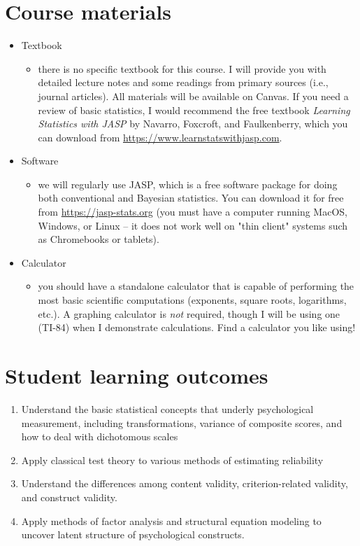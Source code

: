 \documentclass[10pt]{article}
\begin{document}
\section*{Course materials}
\label{sec:org05c7760}
\begin{itemize}
\item Textbook
\begin{itemize}
\item there is no specific textbook for this course. I will provide you with detailed lecture notes and some readings from primary sources (i.e., journal articles). All materials will be available on Canvas. If you need a review of basic statistics, I would recommend the free textbook \emph{Learning Statistics with JASP} by Navarro, Foxcroft, and Faulkenberry, which you can download from \url{https://www.learnstatswithjasp.com}.
\end{itemize}
\item Software
\begin{itemize}
\item we will regularly use JASP, which is a free software package for doing both conventional and Bayesian statistics. You can download it for free from \url{https://jasp-stats.org} (you must have a computer running MacOS, Windows, or Linux -- it does not work well on "thin client" systems such as Chromebooks or tablets).
\end{itemize}
\item Calculator
\begin{itemize}
\item you should have a standalone calculator that is capable of performing the most basic scientific computations (exponents, square roots, logarithms, etc.). A graphing calculator is \emph{not} required, though I will be using one (TI-84) when I demonstrate calculations. Find a calculator you like using!
\end{itemize}
\end{itemize}

\section*{Student learning outcomes}
\label{sec:orgc6557e7}
\begin{enumerate}
\item Understand the basic statistical concepts that underly psychological measurement, including transformations, variance of composite scores, and how to deal with dichotomous scales
\item Apply classical test theory to various methods of estimating reliability
\item Understand the differences among content validity, criterion-related validity, and construct validity.
\item Apply methods of factor analysis and structural equation modeling to uncover latent structure of psychological constructs.
\end{enumerate}
\end{document}
